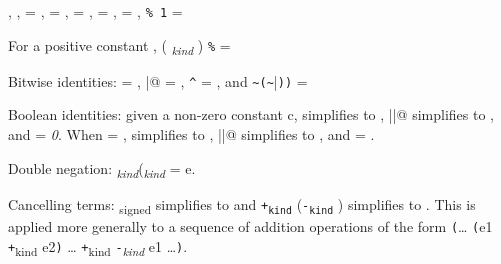 \begin{compactenum}
\begin{compactenum}
    \begin{compactenum}
    \item
        ,   , 
        =
      \code{(-}\code{)},   = , 
        = , 
        = ,
        = \code{-},
       \lstinline|% 1| = 
    \item
      For a positive constant , (
      \code{*}\emph{\textsubscript{kind}} ) \lstinline|%|
       = 
    \end{compactenum}
  \item
    Bitwise identities:  \code{&}  = ,
     \lstinline@|@  = , 
    \lstinline|^|  = , and
    \lstinline|~(~||\lstinline|))| =
  \item
    Boolean identities: given a non-zero constant c, 
    \code{&&}  simplifies to , 
    \lstinline@||@  simplifies to , and
    \code{!} = \emph{0}. When  = , 
    \code{&&}  simplifies to , 
    \lstinline@||@  simplifies to , and
    \code{!} = .
  \item
    Double negation:
    \code{-}\emph{\textsubscript{kind}}(\code{-}\emph{\textsubscript{kind}}
    \code{)} = e.
  \item
    Cancelling terms:  \code{-}\textsubscript{signed} 
    simplifies to  and  \texttt{+\textsubscript{kind}}
    (\texttt{-\textsubscript{kind}} ) simplifies to .
    This is applied more generally to a sequence of addition operations
    of the form \texttt{(}\ldots{} \texttt{(}e1
    \texttt{+}\textsubscript{kind} e2\texttt{)} \ldots{}
    \texttt{+}\textsubscript{kind} \texttt{-}\emph{\textsubscript{kind}}
    e1 \ldots{}\texttt{)}.


\end{compactenum}
\end{compactenum}
